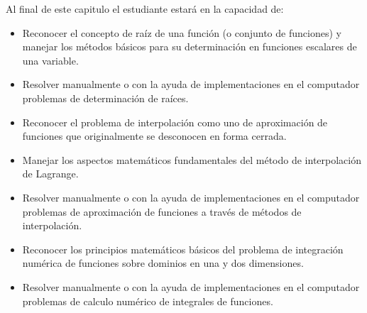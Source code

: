 Al final de este capitulo el estudiante estará en la capacidad de:
\begin{itemize}
\item Reconocer el concepto de raíz de una función (o conjunto de funciones) y 
manejar los métodos básicos para su determinación en funciones escalares de una 
variable.

\item Resolver manualmente o con la ayuda de implementaciones en el 
computador problemas de determinación de raíces.

\item Reconocer el problema de interpolación como uno de aproximación de 
funciones que originalmente se desconocen en forma cerrada.

\item Manejar los aspectos matemáticos fundamentales del método de 
interpolación de Lagrange.

\item Resolver manualmente o con la ayuda de implementaciones en el 
computador problemas de aproximación de funciones a través de métodos de 
interpolación.

\item Reconocer los principios matemáticos básicos del problema de integración 
numérica de funciones sobre dominios en una y dos dimensiones.

\item Resolver manualmente o con la ayuda de implementaciones en el 
computador problemas de calculo numérico de integrales de funciones.
\end{itemize}






